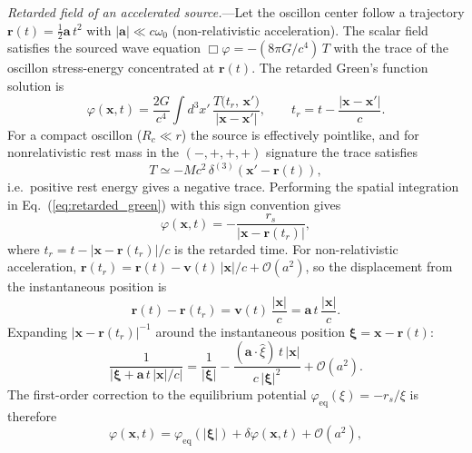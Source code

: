 \documentclass[aps,prd,onecolumn,superscriptaddress,nofootinbib,showpacs,12pt,notitlepage]{revtex4-2}
\renewcommand{\order}[1]{\mathcal{O}\!\left(#1\right)}
\begin{document}
\textit{Retarded field of an accelerated source.}---Let
the oscillon center follow a trajectory
$\mathbf{r}(t) = \frac{1}{2}\mathbf{a}\,t^{2}$ with
$|\mathbf{a}| \ll c\omega_{0}$ (non-relativistic
acceleration).  The scalar field satisfies the sourced
wave equation $\Box\varphi = -(8\pi G/c^{4})\,T$ with the
trace of the oscillon stress-energy concentrated at
$\mathbf{r}(t)$.  The retarded Green's function solution
is
\begin{equation}\label{eq:retarded_green}
  \varphi(\mathbf{x},t) = \frac{2G}{c^{4}}\int d^{3}x'\,
  \frac{T\bigl(t_{r},\,\mathbf{x}'\bigr)}
       {|\mathbf{x}-\mathbf{x}'|},
  \qquad
  t_{r} = t - \frac{|\mathbf{x}-\mathbf{x}'|}{c}.
\end{equation}
For a compact oscillon ($R_{c} \ll r$) the source is
effectively pointlike, and for nonrelativistic rest mass
in the $(-,+,+,+)$ signature the trace satisfies
\begin{equation}\label{eq:T_pointlike}
  T \simeq -Mc^{2}\,
  \delta^{(3)}(\mathbf{x}'-\mathbf{r}(t)),
\end{equation}
i.e.\ positive rest energy gives a negative trace.
Performing the spatial integration in
Eq.~(\ref{eq:retarded_green}) with this sign convention gives
\begin{equation}\label{eq:phi_point}
  \varphi(\mathbf{x},t)
  = -\frac{r_{s}}{|\mathbf{x} - \mathbf{r}(t_{r})|},
\end{equation}
where $t_{r} = t - |\mathbf{x} - \mathbf{r}(t_{r})|/c$
is the retarded time.  For non-relativistic acceleration,
$\mathbf{r}(t_{r}) = \mathbf{r}(t)
- \mathbf{v}(t)\,|\mathbf{x}|/c + \order{a^{2}}$,
so the displacement from the instantaneous position is
\begin{equation}\label{eq:displacement}
  \mathbf{r}(t) - \mathbf{r}(t_{r})
  = \mathbf{v}(t)\,\frac{|\mathbf{x}|}{c}
  = \mathbf{a}\,t\,\frac{|\mathbf{x}|}{c}.
\end{equation}
Expanding $|\mathbf{x} - \mathbf{r}(t_{r})|^{-1}$
around the instantaneous position
$\boldsymbol{\xi} = \mathbf{x} - \mathbf{r}(t)$:
\begin{equation}\label{eq:coulomb_expand}
  \frac{1}{|\boldsymbol{\xi}
    + \mathbf{a}\,t\,|\mathbf{x}|/c|}
  = \frac{1}{|\boldsymbol{\xi}|}
  - \frac{(\mathbf{a}\cdot\hat{\xi})\,t\,|\mathbf{x}|}
         {c\,|\boldsymbol{\xi}|^{2}}
  + \order{a^{2}}.
\end{equation}
The first-order correction to the equilibrium potential
$\varphi_{\mathrm{eq}}(\xi) = -r_{s}/\xi$ is therefore
\begin{equation}\label{eq:phi_ret_expand}
  \varphi(\mathbf{x},t)
  = \varphi_{\mathrm{eq}}(|\boldsymbol{\xi}|)
  + \delta\varphi(\mathbf{x},t)
  + \order{a^{2}},
\end{equation}
\end{document}
